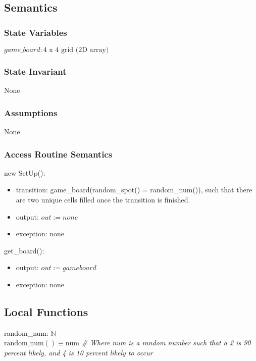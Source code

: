 \documentclass[12pt]{article}
\begin{document}
\subsection* {Semantics}

\subsubsection* {State Variables}

$\mathit{game\_board}: \text{4 x 4 grid (2D array)}$

\subsubsection* {State Invariant}

None

\subsubsection* {Assumptions}

None

\subsubsection* {Access Routine Semantics}

\noindent new SetUp():
\begin{itemize}
\item transition: game\_board(random\_spot() = random\_num()), such that there are two unique cells filled once the transition is finished. 
\item output: $out := none$
\item exception: none
\end{itemize}

\noindent get\_board():
\begin{itemize}
\item output: $out := \mathit{gameboard}$
\item exception: none
\end{itemize}

\subsection*{Local Functions}

\noindent random\_num:  \rightarrow $\mathbb{N}$\\
\noindent $\mbox{random\_num}() \equiv \text{num} $
\textit{\# Where num is a random number such that a 2 is 90 percent likely, and 4 is 10 percent likely to occur} ~\\
\end{document}
